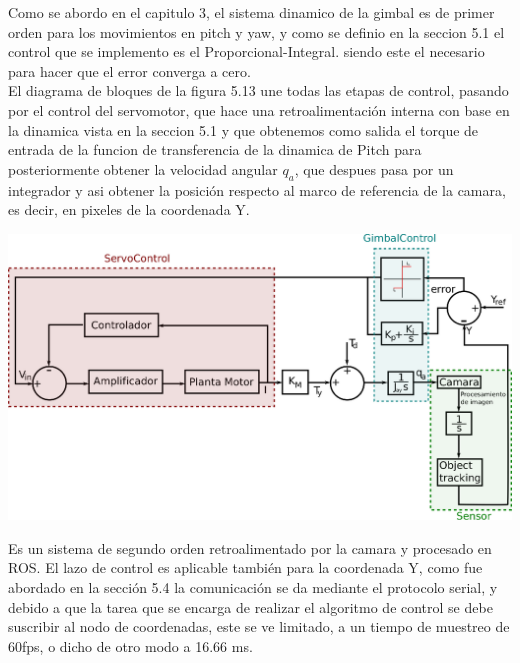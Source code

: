 Como se abordo en el capitulo 3, el sistema dinamico de la gimbal es de primer orden para los movimientos en pitch y yaw, y como se definio en la seccion 5.1
el control que se implemento es el Proporcional-Integral. siendo este el necesario para hacer que el error converga a cero.\\
El diagrama de bloques de la figura 5.13 une todas las etapas de control, pasando por el control del servomotor, que hace una retroalimentación interna con base
en la dinamica vista en la seccion 5.1 y que obtenemos como salida el torque de entrada de la funcion de transferencia de la dinamica de Pitch para posteriormente
obtener la velocidad angular $q_a$, que despues pasa por un integrador y asi obtener la posición respecto al marco de referencia de la camara, es decir, en 
pixeles de la coordenada Y.
\begin{center}
	\includegraphics[width=1.0\textwidth]{Contenido/Cuerpo/Capitulo5/Fig22.eps}
	\label{Fig4}
\end{center}
Es un sistema de segundo orden retroalimentado por la camara y procesado en ROS. El lazo de control es aplicable también para la coordenada Y, como
fue abordado en la sección 5.4 la comunicación se da mediante
el protocolo serial, y debido a que la tarea que se encarga de realizar el algoritmo de control se debe suscribir al nodo de
coordenadas, este se ve limitado, a un tiempo de muestreo de 60fps, o dicho de otro modo a 16.66 ms.


